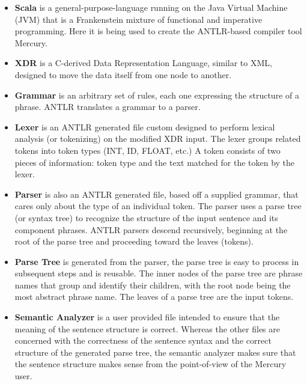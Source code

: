 \begin{itemize}
\item \textbf{Scala} is a general-purpose-language running on the Java Virtual Machine (JVM)
that is a Frankenstein mixture of functional and imperative programming. Here it is being used
to create the ANTLR-based compiler tool Mercury.

\item \textbf{XDR} is a C-derived Data Representation Language, similar to XML, designed to move
the data itself from one node to another.

\item \textbf{Grammar} is an arbitrary set of rules, each one expressing the structure of a
phrase. ANTLR translates a grammar to a parser.

\item \textbf{Lexer} is an ANTLR generated file custom designed to perform lexical analysis (or
tokenizing) on the modified XDR input. The lexer groups related tokens into token types (INT,
ID, FLOAT, etc.) A token consists of two pieces of information: token type and the text matched
for the token by the lexer.

\item \textbf{Parser} is also an ANTLR generated file, based off a supplied grammar, that cares
only about the type of an individual token. The parser uses a parse tree (or syntax tree) to
recognize the structure of the input sentence and its component phrases. ANTLR parsers descend
recursively, beginning at the root of the parse tree and proceeding toward the leaves (tokens).

\item \textbf{Parse Tree} is generated from the parser, the parse tree is easy to process in
subsequent steps and is reusable. The inner nodes of the parse tree are phrase names that group
and identify their children, with the root node being the most abstract phrase name. The leaves
of a parse tree are the input tokens.

\item \textbf{Semantic Analyzer} is a user provided file intended to ensure that the meaning of
the sentence structure is correct. Whereas the other files are concerned with the correctness of
the sentence syntax and the correct structure of the generated parse tree, the semantic analyzer
makes sure that the sentence structure makes sense from the point-of-view of the Mercury user.


\end{itemize}
